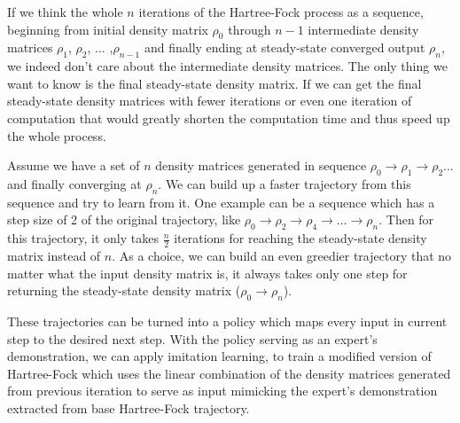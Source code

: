\documentclass[twoside,11pt]{article}
\begin{document}

If we think the whole $n$ iterations of the Hartree-Fock process as a sequence, beginning from initial density matrix $\rho_0$ through $n-1$ intermediate density matrices $\rho_1$,  $\rho_2$,  $\ldots$ ,$\rho_{n-1}$ and finally ending at steady-state converged output $\rho_{n}$, we indeed don't care about the intermediate density matrices. The only thing we want to know is the final steady-state density matrix. If we can get the final steady-state density matrices with fewer iterations or even one iteration of computation that would greatly shorten the computation time and thus speed up the whole process. 



Assume we have a set of $n$ density matrices generated in sequence   $\rho_0 \rightarrow  \rho_1 \rightarrow  \rho_2  \ldots  $ and finally converging at $\rho_{n}$. 
We can build up a faster trajectory from this sequence and try to learn from it.
One example can be a sequence which has a step size of 2 of the original trajectory, like $\rho_0 \rightarrow \rho_2 \rightarrow  \rho_4 \rightarrow  \ldots \rightarrow  \rho_{n}$. Then for this trajectory, it only takes $\frac{n}{2}$ iterations for reaching the steady-state density matrix instead of $n$.
As a choice, we can build an even greedier trajectory that no matter what the input density matrix is, it always takes only one step for returning the steady-state density matrix ($\rho_0 \rightarrow \rho_{n}$).


These trajectories can be turned into a policy which maps every input in current step to the desired next step. With the policy serving as an expert's demonstration, we can apply imitation learning, to train a modified version of Hartree-Fock which uses the linear combination of the density matrices generated from previous iteration to serve as input mimicking the expert's demonstration extracted from base Hartree-Fock trajectory.
\end{document}
